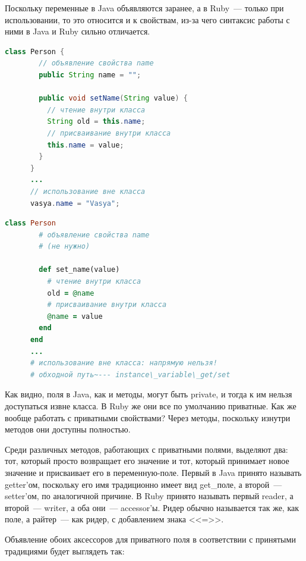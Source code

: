 \documentclass[a4paper, 14pt, titlepage]{extarticle}
\newenvironment{halfpage}%
    {\noindent\begin{minipage}[h]{0.49\linewidth}} %
    {\end{minipage}\hfill}
\begin{document}
  Поскольку переменные в Java объявляются заранее, а в Ruby~--- только при использовании, то это
  относится и к свойствам, из-за чего синтаксис работы с ними в Java и Ruby сильно отличается.

  \begin{halfpage}
    \begin{lstlisting}[language=Java, title={Свойство в Java}, gobble=6, texcl]
      class Person {
        // объявление свойства name
        public String name = "";
        
        public void setName(String value) {
          // чтение внутри класса
          String old = this.name;
          // присваивание внутри класса
          this.name = value;
        }
      }
      ...
      // использование вне класса
      vasya.name = "Vasya";
    \end{lstlisting}
  \end{halfpage}
  \begin{halfpage}
    \begin{lstlisting}[language=Ruby, title={Свойство в Ruby}, gobble=6, texcl]
      class Person
        # объявление свойства name
        # (не нужно)

        def set_name(value)
          # чтение внутри класса
          old = @name
          # присваивание внутри класса
          @name = value
        end
      end
      ...
      # использование вне класса: напрямую нельзя!
      # обходной путь~--- instance\_variable\_get/set
    \end{lstlisting}
  \end{halfpage}

  Как видно, поля в Java, как и методы, могут быть private, и тогда к им нельзя доступаться извне
  класса. В Ruby же они все по умолчанию приватные. Как же вообще работать с приватными свойствами?
  Через методы, поскольку изнутри методов они доступны полностью.

  Среди различных методов, работающих с приватными полями, выделяют два: тот, который просто
  возвращает его значение и тот, который принимает новое значение и присваивает его в
  переменную-поле. Первый в Java принято называть getter'ом, поскольку его имя традиционно имеет вид
  get\_поле, а второй~--- setter'ом, по аналогичной причине. В Ruby принято называть первый
  reader, а второй~--- writer, а оба они~--- accessor'ы. Ридер обычно называется так же, как поле, а
  райтер~--- как ридер, с добавлением знака <<=>>.

  Объявление обоих аксессоров для приватного поля в соответствии с принятыми традициями будет
  выглядеть так:
\end{document}
